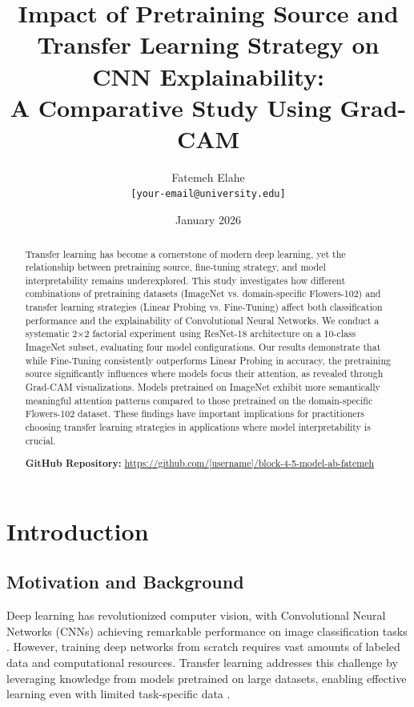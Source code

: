 \documentclass[11pt,a4paper]{article}
\title{\textbf{Impact of Pretraining Source and Transfer Learning Strategy on CNN Explainability:\\A Comparative Study Using Grad-CAM}}
\author{
    Fatemeh Elahe\\
    \texttt{[your-email@university.edu]}
}
\date{January 2026}
\begin{document}
\maketitle

\begin{abstract}
Transfer learning has become a cornerstone of modern deep learning, yet the relationship between pretraining source, fine-tuning strategy, and model interpretability remains underexplored. This study investigates how different combinations of pretraining datasets (ImageNet vs. domain-specific Flowers-102) and transfer learning strategies (Linear Probing vs. Fine-Tuning) affect both classification performance and the explainability of Convolutional Neural Networks. We conduct a systematic 2×2 factorial experiment using ResNet-18 architecture on a 10-class ImageNet subset, evaluating four model configurations. Our results demonstrate that while Fine-Tuning consistently outperforms Linear Probing in accuracy, the pretraining source significantly influences where models focus their attention, as revealed through Grad-CAM visualizations. Models pretrained on ImageNet exhibit more semantically meaningful attention patterns compared to those pretrained on the domain-specific Flowers-102 dataset. These findings have important implications for practitioners choosing transfer learning strategies in applications where model interpretability is crucial.

\vspace{0.3cm}
\noindent\textbf{GitHub Repository:} \url{https://github.com/[username]/block-4-5-model-ab-fatemeh}
\end{abstract}

\section{Introduction}

\subsection{Motivation and Background}

Deep learning has revolutionized computer vision, with Convolutional Neural Networks (CNNs) achieving remarkable performance on image classification tasks \citep{krizhevsky2012imagenet}. However, training deep networks from scratch requires vast amounts of labeled data and computational resources. Transfer learning addresses this challenge by leveraging knowledge from models pretrained on large datasets, enabling effective learning even with limited task-specific data \citep{yosinski2014transferable}.
\end{document}
